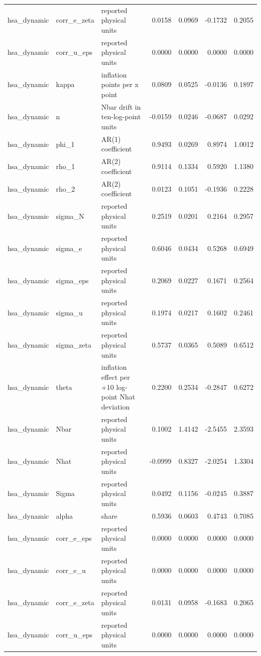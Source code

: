\begin{tabular}{lllrrrr}
hsa\_dynamic & corr\_e\_zeta & reported physical units & 0.0158 & 0.0969 & -0.1732 & 0.2055 \\
hsa\_dynamic & corr\_u\_eps & reported physical units & 0.0000 & 0.0000 & 0.0000 & 0.0000 \\
hsa\_dynamic & kappa & inflation points per x point & 0.0809 & 0.0525 & -0.0136 & 0.1897 \\
hsa\_dynamic & n & Nbar drift in ten-log-point units & -0.0159 & 0.0246 & -0.0687 & 0.0292 \\
hsa\_dynamic & phi\_1 & AR(1) coefficient & 0.9493 & 0.0269 & 0.8974 & 1.0012 \\
hsa\_dynamic & rho\_1 & AR(2) coefficient & 0.9114 & 0.1334 & 0.5920 & 1.1380 \\
hsa\_dynamic & rho\_2 & AR(2) coefficient & 0.0123 & 0.1051 & -0.1936 & 0.2228 \\
hsa\_dynamic & sigma\_N & reported physical units & 0.2519 & 0.0201 & 0.2164 & 0.2957 \\
hsa\_dynamic & sigma\_e & reported physical units & 0.6046 & 0.0434 & 0.5268 & 0.6949 \\
hsa\_dynamic & sigma\_eps & reported physical units & 0.2069 & 0.0227 & 0.1671 & 0.2564 \\
hsa\_dynamic & sigma\_u & reported physical units & 0.1974 & 0.0217 & 0.1602 & 0.2461 \\
hsa\_dynamic & sigma\_zeta & reported physical units & 0.5737 & 0.0365 & 0.5089 & 0.6512 \\
hsa\_dynamic & theta & inflation effect per +10 log-point Nhat deviation & 0.2200 & 0.2534 & -0.2847 & 0.6272 \\
hsa\_dynamic & Nbar & reported physical units & 0.1002 & 1.4142 & -2.5455 & 2.3593 \\
hsa\_dynamic & Nhat & reported physical units & -0.0999 & 0.8327 & -2.0254 & 1.3304 \\
hsa\_dynamic & Sigma & reported physical units & 0.0492 & 0.1156 & -0.0245 & 0.3887 \\
hsa\_dynamic & alpha & share & 0.5936 & 0.0603 & 0.4743 & 0.7085 \\
hsa\_dynamic & corr\_e\_eps & reported physical units & 0.0000 & 0.0000 & 0.0000 & 0.0000 \\
hsa\_dynamic & corr\_e\_u & reported physical units & 0.0000 & 0.0000 & 0.0000 & 0.0000 \\
hsa\_dynamic & corr\_e\_zeta & reported physical units & 0.0131 & 0.0958 & -0.1683 & 0.2065 \\
hsa\_dynamic & corr\_u\_eps & reported physical units & 0.0000 & 0.0000 & 0.0000 & 0.0000 \\

\end{tabular}
